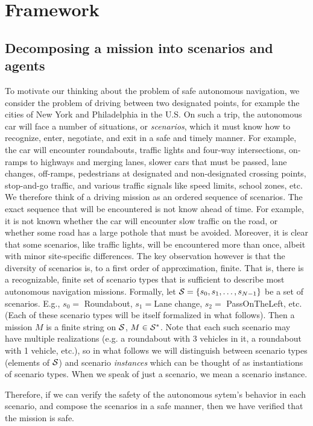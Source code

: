 \section{Framework}
\label{framework}

\subsection{Decomposing a mission into scenarios and agents}
To motivate our thinking about the problem of safe autonomous navigation, we consider the problem of driving between two designated points, for example the cities of New York and Philadelphia in the U.S.
On such a trip, the autonomous car will face a number of situations, or \emph{scenarios}, which it must know how to recognize, enter, negotiate, and exit in a safe and timely manner.
For example, the car will encounter roundabouts, 
traffic lights and four-way intersections, 
on-ramps to highways and merging lanes, 
slower cars that must be passed, 
lane changes, 
off-ramps, 
pedestrians at designated and non-designated crossing points, 
stop-and-go traffic, 
and various traffic signals like speed limits, school zones, etc.
We therefore think of a driving mission as an ordered sequence of scenarios.
The exact sequence that will be encountered is not know ahead of time. 
For example, it is not known whether the car will encounter slow traffic on the road, or whether some road has a large pothole that must be avoided.
Moreover, it is clear that some scenarios, like traffic lights, will be encountered more than once, albeit with minor site-specific differences. 
The key observation however is that the diversity of scenarios is, to a first order of approximation, finite. 
That is, there is a recognizable, finite set of scenario types that is sufficient to describe most autonomous navigation missions.
Formally, let $\mathcal{S} = \{s_0,s_1,\ldots,s_{N-1}\}$ be a set of scenarios. 
E.g., $s_0 = $ Roundabout, $s_1 = $Lane change, $s_2 = $ PassOnTheLeft, etc. 
(Each of these scenario types will be itself formalized in what follows).
Then a mission $M$ is a finite string on $\mathcal{S}$, $M \in \mathcal{S}^*$.
Note that each such scenario may have multiple realizations (e.g. a roundabout with 3 vehicles in it, a roundabout with 1 vehicle, etc.), so in what follows we will distinguish between scenario types (elements of $\mathcal{S}$) and scenario \emph{instances} which can be thought of as instantiations of scenario types.
When we speak of just a scenario, we mean a scenario instance.

Therefore, if we can verify the safety of the autonomous sytem's behavior in each scenario,
and compose the scenarios in a safe manner, 
then we have verified that the mission is safe.


